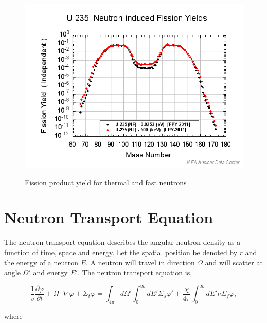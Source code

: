 \begin{figure}[t]
  \centering
  \includegraphics[width=5.5in]{images/fissionYield.png}\\
  \caption{Fission product yield for thermal and fast neutrons}
  \label{fig:fissionYield}
\end{figure} 


\section{Neutron Transport Equation}
The neutron transport equation describes the angular neutron density as a function of time, space and energy. Let the spatial position be denoted by $r$ and the energy of a neutron $E$. A neutron will travel in direction $\Omega$ and will scatter at angle $\Omega'$ and energy $E'$.  The neutron transport equation is,

\begin{equation}
    \frac{1}{v}\frac{\partial \varphi}{\partial t} + \Omega \cdot \nabla \varphi + \Sigma_{t}\varphi = \int_{4\pi} d\Omega'\int_{0}^{\infty}dE'\Sigma_{s}\varphi' + \frac{\chi}{4\pi}\int_{0}^{\infty}dE'\nu\Sigma_{f}\varphi,
    \label{eq:angularNeutronTransport}
\end{equation}

\noindent where 

